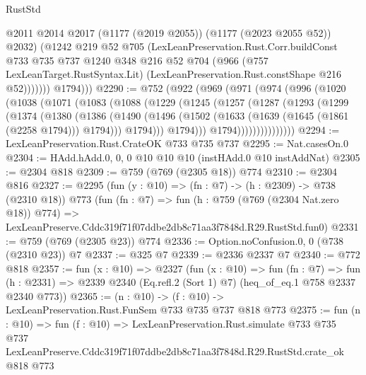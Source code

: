 \begin{lexlean}{RustStd}
\begin{coremodule}
                  @2011
                  @2014
                  @2017
                  (@1177 (@2019 @2055))
                  (@1177 (@2023 @2055 @52))
                  @2032)
                (@1242
                  @219
                  @52
                  @705
                  (LexLeanPreservation.Rust.Corr.buildConst
                    @733
                    @735
                    @737
                    @1240
                    @348
                    @216
                    @52
                    @704
                    (@966
                      (@757 LexLeanTarget.RustSyntax.Lit)
                      (LexLeanPreservation.Rust.constShape @216 @52)))))))
          @1794)))
@2290 := @752
    (@922
      (@969
        (@971
          (@974
            (@996
              (@1020
                (@1038
                  (@1071
                    (@1083
                      (@1088
                        (@1229
                          (@1245
                            (@1257
                              (@1287
                                (@1293
                                  (@1299
                                    (@1374
                                      (@1380
                                        (@1386
                                          (@1490
                                            (@1496
                                              (@1502
                                                (@1633 (@1639 (@1645 (@1861 (@2258 @1794))) @1794)))
                                              @1794)))
                                        @1794)))
                                  @1794)))))))))))))))
@2294 := LexLeanPreservation.Rust.CrateOK @733 @735 @737
@2295 := Nat.casesOn.{0}
@2304 := HAdd.hAdd.{0, 0, 0} @10 @10 @10 (instHAdd.{0} @10 instAddNat)
@2305 := @2304 @818
@2309 := @759 (@769 (@2305 @18)) @774
@2310 := @2304 @816
@2327 := @2295
    (fun (y : @10) => (fn : @7) -> (h : @2309) -> @738 (@2310 @18))
    @773
    (fun (fn : @7) =>
    fun (h : @759 (@769 (@2304 Nat.zero @18)) @774) =>
    LexLeanPreserve.Cddc319f71f07ddbe2db8c71aa3f7848d.R29.RustStd.fun0)
@2331 := @759 (@769 (@2305 @23)) @774
@2336 := Option.noConfusion.{0, 0} (@738 (@2310 @23)) @7
@2337 := @325 @7
@2339 := @2336 @2337 @7
@2340 := @772 @818
@2357 := fun (x : @10) =>
  @2327
    (fun (x : @10) =>
    fun (fn : @7) =>
    fun (h : @2331) => @2339 @2340 (Eq.refl.{2} (Sort 1) @7) (heq_of_eq.{1} @758 @2337 @2340 @773))
@2365 := (n : @10) -> (f : @10) -> LexLeanPreservation.Rust.FunSem @733 @735 @737 @818 @773
@2375 := fun (n : @10) =>
  fun (f : @10) =>
  LexLeanPreservation.Rust.simulate
    @733
    @735
    @737
    LexLeanPreserve.Cddc319f71f07ddbe2db8c71aa3f7848d.R29.RustStd.crate_ok
    @818
    @773
\end{coremodule}
\end{lexlean}
